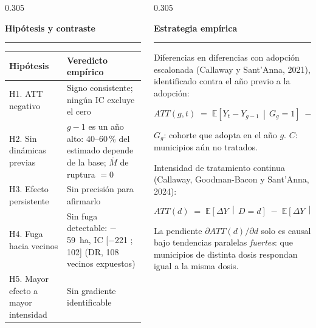 \documentclass[final,t]{beamer}
\newcommand{\seccion}[2]{%
  \par\vspace{0.5\baselineskip}%
  {\color{dosel}\Large\bfseries #1\hfill{\color{tenue}\normalsize\mdseries #2}}\par
  \vspace{-0.35\baselineskip}%
  {\color{dosel}\rule{\linewidth}{2.2pt}}\par
  \vspace{0.25\baselineskip}%
}
\newcommand{\nota}[1]{{\color{tenue}\small #1\par}}
\begin{document}
\begin{frame}[t]{}
\begin{columns}[t]
\begin{column}{0.305\paperwidth}
\seccion{Hipótesis y contraste}{}
\begin{center}
\begin{tabularx}{\linewidth}{lX}
\toprule
\rowcolor{dosel}
\textcolor{papel}{\textbf{Hipótesis}} & \textcolor{papel}{\textbf{Veredicto empírico}}\\
\midrule
H1. ATT negativo           & Signo consistente; ningún IC excluye el cero\\
H2. Sin dinámicas previas  & $g-1$ es un año alto: 40--60\,\% del estimado depende de la base;
                             $\bar{M}$ de ruptura $=0$\\
H3. Efecto persistente     & Sin precisión para afirmarlo\\
H4. Fuga hacia vecinos     & Sin fuga detectable: $-$59~ha, IC [$-$221 ; 102] (DR, 108 vecinos expuestos)\\
H5. Mayor efecto a mayor intensidad & Sin gradiente identificable\\
\bottomrule
\end{tabularx}
\end{center}

\end{column}

\begin{column}{0.305\paperwidth}
\justifying

\seccion{Estrategia empírica}{}
\nota{Diferencias en diferencias con adopción escalonada (Callaway y Sant'Anna, 2021),
identificado contra el año previo a la adopción:}
\begin{tcolorbox}[colback=cajafondo,colframe=regla,boxrule=0.8pt,sharp corners]
\centering
\[
  ATT(g,t) \;=\; \mathbb{E}\!\left[Y_{t}-Y_{g-1}\,\middle|\,G_{g}=1\right]
               \;-\; \mathbb{E}\!\left[Y_{t}-Y_{g-1}\,\middle|\,C=1\right]
\]
\raggedright\nota{$G_g$: cohorte que adopta en el año $g$. $C$: municipios aún no tratados.}
\end{tcolorbox}

\nota{Intensidad de tratamiento continua (Callaway, Goodman-Bacon y Sant'Anna, 2024):}
\begin{tcolorbox}[colback=cajafondo,colframe=regla,boxrule=0.8pt,sharp corners]
\centering
\[
  ATT(d) \;=\; \mathbb{E}\!\left[\Delta Y \,\middle|\, D=d\right]
         \;-\; \mathbb{E}\!\left[\Delta Y \,\middle|\, D=0\right]
\]
\raggedright\nota{La pendiente $\partial ATT(d)/\partial d$ solo es causal bajo tendencias
paralelas \emph{fuertes}: que municipios de distinta dosis respondan igual a la misma dosis.}
\end{tcolorbox}


\end{column}
\end{columns}
\end{frame}
\end{document}
